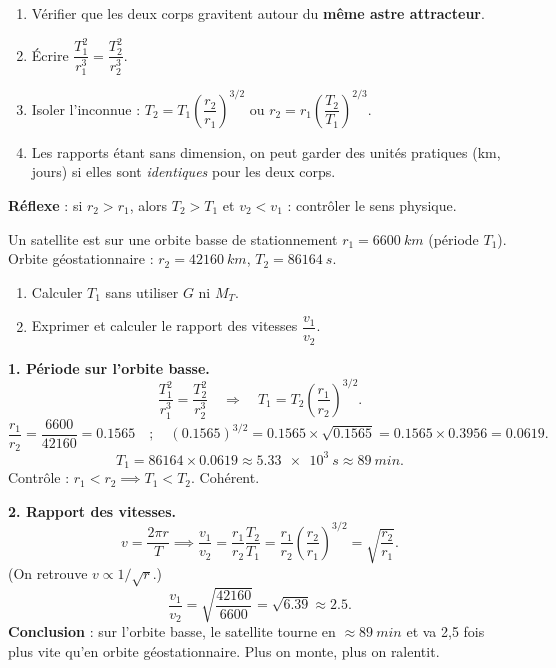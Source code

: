 \documentclass[11pt]{article}
\begin{document}
\begin{methode}
\begin{enumerate}
\item Vérifier que les deux corps gravitent autour du \textbf{même astre attracteur}.
\item Écrire $\dfrac{T_1^2}{r_1^3} = \dfrac{T_2^2}{r_2^3}$.
\item Isoler l'inconnue : $T_2 = T_1\left(\dfrac{r_2}{r_1}\right)^{3/2}$ ou $r_2 = r_1\left(\dfrac{T_2}{T_1}\right)^{2/3}$.
\item Les rapports étant sans dimension, on peut garder des unités pratiques (km, jours) si elles sont \emph{identiques} pour les deux corps.
\end{enumerate}
\textbf{Réflexe} : si $r_2 > r_1$, alors $T_2 > T_1$ et $v_2 < v_1$ : contrôler le sens physique.
\end{methode}

\begin{exoresolu}
Un satellite est sur une orbite basse de stationnement $r_1 = \SI{6600}{km}$ (période $T_1$). Orbite géostationnaire : $r_2 = \SI{42160}{km}$, $T_2 = \SI{86164}{s}$.
\begin{enumerate}
\item Calculer $T_1$ sans utiliser $G$ ni $M_T$.
\item Exprimer et calculer le rapport des vitesses $\dfrac{v_1}{v_2}$.
\end{enumerate}
\tcblower
\textbf{1. Période sur l'orbite basse.}
\[ \frac{T_1^2}{r_1^3} = \frac{T_2^2}{r_2^3} \quad \Longrightarrow \quad T_1 = T_2\left(\frac{r_1}{r_2}\right)^{3/2}. \]
\[ \frac{r_1}{r_2} = \frac{6600}{42160} = \num{0,1565} \quad ; \quad (\num{0,1565})^{3/2} = \num{0,1565} \times \sqrt{\num{0,1565}} = \num{0,1565} \times \num{0,3956} = \num{0,0619}. \]
\[ T_1 = 86164 \times \num{0,0619} \approx \SI{5,33e3}{s} \approx \SI{89}{min}. \]
Contrôle : $r_1 < r_2 \implies T_1 < T_2$. Cohérent.

\textbf{2. Rapport des vitesses.}
\[ v = \frac{2\pi r}{T} \implies \frac{v_1}{v_2} = \frac{r_1}{r_2}\frac{T_2}{T_1} = \frac{r_1}{r_2}\left(\frac{r_2}{r_1}\right)^{3/2} = \sqrt{\frac{r_2}{r_1}}. \]
(On retrouve $v \propto 1/\sqrt{r}$.)
\[ \frac{v_1}{v_2} = \sqrt{\frac{42160}{6600}} = \sqrt{\num{6,39}} \approx \num{2,5}. \]
\textbf{Conclusion} : sur l'orbite basse, le satellite tourne en $\approx \SI{89}{min}$ et va 2,5 fois plus vite qu'en orbite géostationnaire. Plus on monte, plus on ralentit.
\end{exoresolu}
\end{document}
